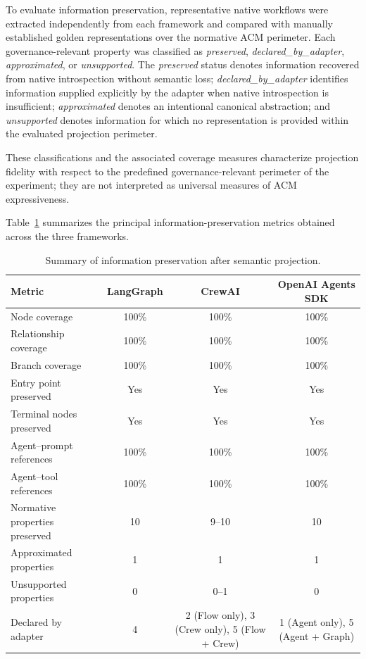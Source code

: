 \documentclass[10pt]{article}
\begin{document}
To evaluate information preservation, representative native workflows were extracted independently from each framework and compared with manually established golden representations over the normative ACM perimeter. Each governance-relevant property was classified as \emph{preserved}, \emph{declared\_by\_adapter}, \emph{approximated}, or \emph{unsupported}. The \emph{preserved} status denotes information recovered from native introspection without semantic loss; \emph{declared\_by\_adapter} identifies information supplied explicitly by the adapter when native introspection is insufficient; \emph{approximated} denotes an intentional canonical abstraction; and \emph{unsupported} denotes information for which no representation is provided within the evaluated projection perimeter.

These classifications and the associated coverage measures characterize projection fidelity with respect to the predefined governance-relevant perimeter of the experiment; they are not interpreted as universal measures of ACM expressiveness.

Table~\ref{tab:projection_results} summarizes the principal information-preservation metrics obtained across the three frameworks.

\begin{table}[t]
	\centering
	\caption{Summary of information preservation after semantic projection.}
	\label{tab:projection_results}
	\small
	\begin{tabular}{lccc}
		\toprule
		\textbf{Metric}
		&
		\textbf{LangGraph}
		&
		\textbf{CrewAI}
		&
		\textbf{OpenAI Agents SDK}
		\\
		\midrule
		Node coverage & 100\% & 100\% & 100\% \\
		Relationship coverage & 100\% & 100\% & 100\% \\
		Branch coverage & 100\% & 100\% & 100\% \\
		Entry point preserved & Yes & Yes & Yes \\
		Terminal nodes preserved & Yes & Yes & Yes \\
		Agent--prompt references & 100\% & 100\% & 100\% \\
		Agent--tool references & 100\% & 100\% & 100\% \\
		Normative properties preserved & 10 & 9--10 & 10 \\
		Approximated properties & 1 & 1 & 1 \\
		Unsupported properties & 0 & 0--1 & 0 \\
		Declared by adapter & 4 & 2 (Flow only), 3 (Crew only), 5 (Flow + Crew) & 1 (Agent only), 5 (Agent + Graph) \\
		\bottomrule
	\end{tabular}
\end{table}
\end{document}
